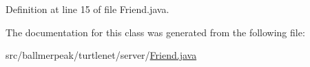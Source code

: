 Definition at line 15 of file Friend.\-java.



The documentation for this class was generated from the following file\-:\begin{DoxyCompactItemize}
\item 
src/ballmerpeak/turtlenet/server/\hyperlink{Friend_8java}{Friend.\-java}\end{DoxyCompactItemize}
